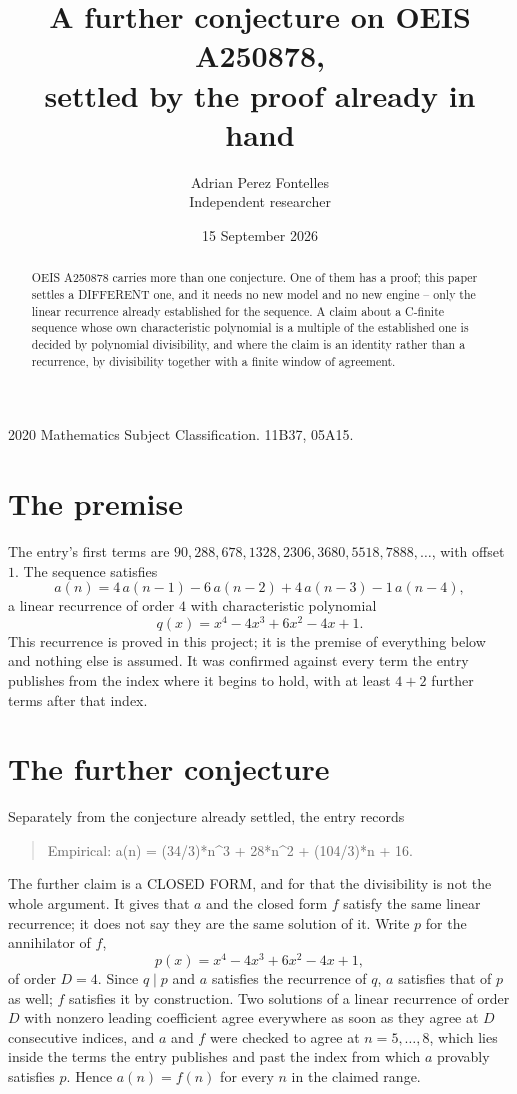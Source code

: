 \documentclass[11pt,a4paper]{article}
\title{A further conjecture on OEIS A250878,\\ \large settled by the proof already in hand}
\author{Adrian Perez Fontelles\\ \small Independent researcher}
\date{15 September 2026}
\theoremstyle{plain}
\theoremstyle{definition}
\begin{document}
\maketitle

\begin{abstract}
OEIS A250878 carries more than one conjecture. One of them has a proof; this paper settles a
DIFFERENT one, and it needs no new model and no new engine -- only the linear recurrence already
established for the sequence. A claim about a C-finite sequence whose own characteristic
polynomial is a multiple of the established one is decided by polynomial divisibility, and where
the claim is an identity rather than a recurrence, by divisibility together with a finite window
of agreement.
\end{abstract}

\noindent\small 2020 Mathematics Subject Classification. 11B37, 05A15.\normalsize

\section{The premise}

The entry's first terms are $90, 288, 678, 1328, 2306, 3680, 5518, 7888,\dots$, with offset $1$. The sequence satisfies
\[
  a(n)=4\,a(n-1) - 6\,a(n-2) + 4\,a(n-3) - 1\,a(n-4) ,
\]
a linear recurrence of order $4$ with characteristic polynomial
\[
  q(x)=x^{4} - 4 x^{3} + 6 x^{2} - 4 x + 1 .
\]
This recurrence is proved in this project; it is the premise of everything below and nothing else is assumed.
It was confirmed against every term the entry publishes from the index where it begins to hold,
with at least $4+2$ further terms after that index.

\section{The further conjecture}

Separately from the conjecture already settled, the entry records

\begin{quote}\raggedright Empirical: a(n) = (34/3)*n\^{}3 + 28*n\^{}2 + (104/3)*n + 16.\end{quote}

The further claim is a CLOSED FORM, and for that the divisibility is not the whole argument. It
gives that $a$ and the closed form $f$ satisfy the same linear recurrence; it does not say they
are the same solution of it. Write $p$ for the annihilator of $f$,
\[
  p(x)=x^{4} - 4 x^{3} + 6 x^{2} - 4 x + 1 ,
\]
of order $D=4$. Since $q\mid p$ and $a$ satisfies the recurrence of $q$, $a$ satisfies that of
$p$ as well; $f$ satisfies it by construction. Two solutions of a linear recurrence of order $D$
with nonzero leading coefficient agree everywhere as soon as they agree at $D$ consecutive
indices, and $a$ and $f$ were checked to agree at $n=5,\dots,8$,
which lies inside the terms the entry publishes and past the index from which $a$ provably
satisfies $p$. Hence $a(n)=f(n)$ for every $n$ in the claimed range.
\end{document}
